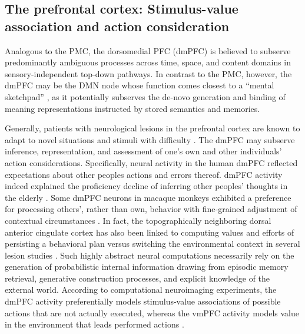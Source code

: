 \documentclass[10pt,letterpaper]{article}
\begin{document}
\subsection{The prefrontal cortex: Stimulus-value association and action consideration}
Analogous to the PMC,
the dorsomedial PFC (dmPFC) is believed to subserve predominantly ambiguous processes
across time, space, and content domains in
sensory-independent top-down pathways.
In contrast to the PMC, however,
the dmPFC may be the DMN node whose function comes closest to a
``mental sketchpad'' \citep{goldman1996prefrontal}, as it
potentially subserves the de-novo generation and binding
of meaning representations instructed by stored semantics and memories.



Generally,
patients with neurological lesions in the prefrontal cortex
are known to adapt to novel situations and stimuli with difficulty
\citep{stuss1986frontal}.
The dmPFC may subserve inference, representation, and assessment
of one's own and other individuals' action considerations.
Specifically, neural activity in the human dmPFC
reflected expectations about other peoples actions and errors thereof.
dmPFC activity indeed explained the proficiency decline
of inferring other peoples' thoughts in the elderly \citep{moran2012social}.
Some dmPFC neurons in macaque monkeys exhibited a preference
for processing others', rather than own, behavior
with fine-grained adjustment of contextual circumstances \citep{yoshida2010neural}.
In fact, the topographically neighboring dorsal anterior cingulate cortex
has also been linked to computing values and efforts of
persisting a behavioral plan versus switching the
environmental context in several lesion studies \citep{kolling2016value}.
%
Such highly abstract neural computations necessarily rely on the
generation of probabilistic internal information drawing from
episodic memory retrieval, generative construction processes,
and explicit knowledge of the external world.
%
According to computational neuroimaging experiments,
the dmPFC activity preferentially models stimulus-value associations of
possible actions that are not actually executed,
whereas the vmPFC activity models value in the environment that leads performed actions
\citep{nicolle2012agent}.
\end{document}
